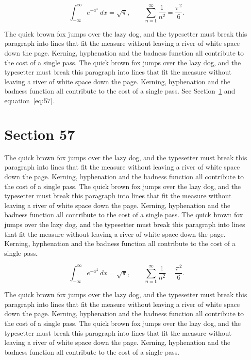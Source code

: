\documentclass{article}
\begin{document}
\begin{equation}\label{eq:56}
\int_{-\infty}^{\infty} e^{-x^{2}}\,dx = \sqrt{\pi}, \qquad
\sum_{n=1}^{\infty} \frac{1}{n^{2}} = \frac{\pi^{2}}{6}.
\end{equation}

The quick brown fox jumps over the lazy dog, and the typesetter must break this paragraph into lines that fit the measure without leaving a river of white space down the page. Kerning, hyphenation and the badness function all contribute to the cost of a single pass. The quick brown fox jumps over the lazy dog, and the typesetter must break this paragraph into lines that fit the measure without leaving a river of white space down the page. Kerning, hyphenation and the badness function all contribute to the cost of a single pass. 
See Section~\ref{sec:57} and equation~\eqref{eq:57}.
\section{Section 57}
\label{sec:57}
The quick brown fox jumps over the lazy dog, and the typesetter must break this paragraph into lines that fit the measure without leaving a river of white space down the page. Kerning, hyphenation and the badness function all contribute to the cost of a single pass. The quick brown fox jumps over the lazy dog, and the typesetter must break this paragraph into lines that fit the measure without leaving a river of white space down the page. Kerning, hyphenation and the badness function all contribute to the cost of a single pass. The quick brown fox jumps over the lazy dog, and the typesetter must break this paragraph into lines that fit the measure without leaving a river of white space down the page. Kerning, hyphenation and the badness function all contribute to the cost of a single pass. 

\begin{equation}\label{eq:57}
\int_{-\infty}^{\infty} e^{-x^{2}}\,dx = \sqrt{\pi}, \qquad
\sum_{n=1}^{\infty} \frac{1}{n^{2}} = \frac{\pi^{2}}{6}.
\end{equation}

The quick brown fox jumps over the lazy dog, and the typesetter must break this paragraph into lines that fit the measure without leaving a river of white space down the page. Kerning, hyphenation and the badness function all contribute to the cost of a single pass. The quick brown fox jumps over the lazy dog, and the typesetter must break this paragraph into lines that fit the measure without leaving a river of white space down the page. Kerning, hyphenation and the badness function all contribute to the cost of a single pass. 
\end{document}
